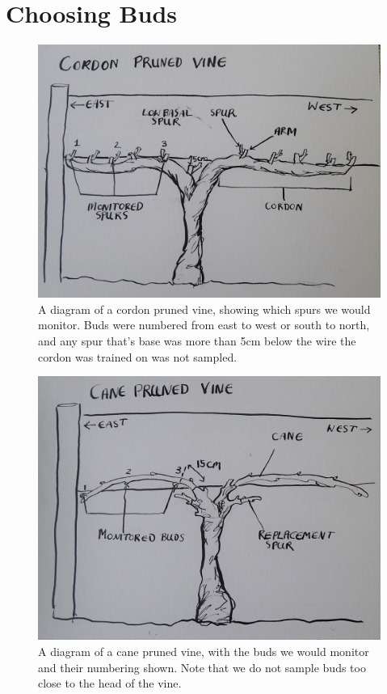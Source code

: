 \documentclass[11pt,letter]{article}
\begin{document}
\section{Choosing Buds}

\begin{figure}%
  \includegraphics[width=\linewidth]{CordonPruned.jpg}
  \caption{A diagram of a cordon pruned vine, showing which spurs we would monitor. Buds were numbered from east to west or south to north, and any spur that's base was more than 5cm below the wire the cordon was trained on was not sampled.}
  \label{fig:CordonPruned}
\end{figure}

\begin{figure}%
  \includegraphics[width=\linewidth]{CanePruned.jpg}
  \caption{A diagram of a cane pruned vine, with the buds we would monitor and their numbering shown. Note that we do not sample buds too close to the head of the vine.}
  \label{fig:CanePruned}
\end{figure}
\end{document}
